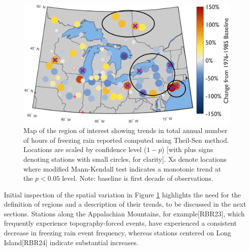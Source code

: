 \documentclass[twocol]{ametsoc}
\begin{document}
\begin{figure}
\centering
\includegraphics[width=1.0\textwidth]{trendmap.png}
\caption{\label{fig:trendmap}Map of the region of interest showing trends in total annual number of hours of freezing rain reported computed using Theil-Sen method. Locations are scaled by confidence level ($1 - p$) [with plus signs denoting stations with small circles, for clarity]. Xs denote locations where modified Mann-Kendall test indicates a monotonic trend at the $p<0.05$ level. Note: baseline is first decade of observations.}
\end{figure}

Initial inspection of the spatial variation in Figure \ref{fig:trendmap} highlights the need for the definition of regions and a description of their trends, to be discussed in the next sections. Stations along the Appalachian Mountains, for example[RBR23], which frequently experience topography-forced events, have experienced a consistent decrease in freezing rain event frequency, whereas stations centered on Long Island[RBR24] indicate substantial increases.  
\end{document}
